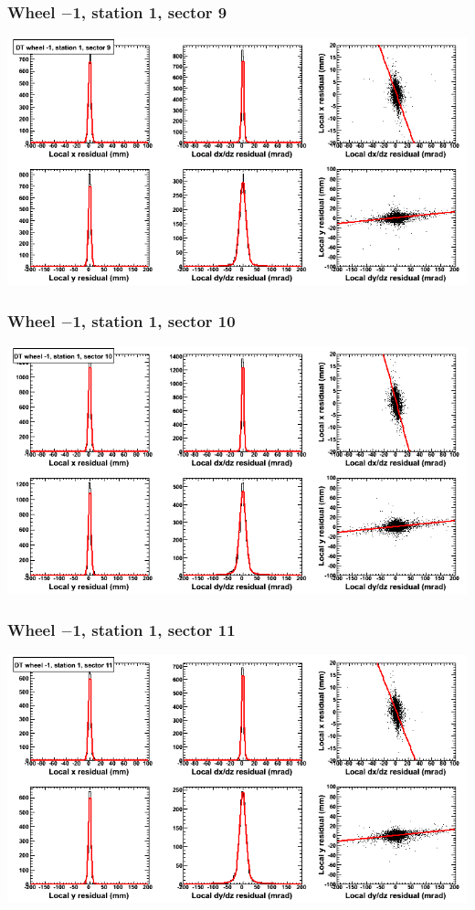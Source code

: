 \documentclass[compress]{beamer}
\begin{document}
\begin{frame}
\frametitle{Wheel $-$1, station 1, sector 9}
\includegraphics[width=\linewidth]{tmpbell_MBwhBst1sec09.png}
\end{frame}

\begin{frame}
\frametitle{Wheel $-$1, station 1, sector 10}
\includegraphics[width=\linewidth]{tmpbell_MBwhBst1sec10.png}
\end{frame}

\begin{frame}
\frametitle{Wheel $-$1, station 1, sector 11}
\includegraphics[width=\linewidth]{tmpbell_MBwhBst1sec11.png}
\end{frame}
\end{document}
